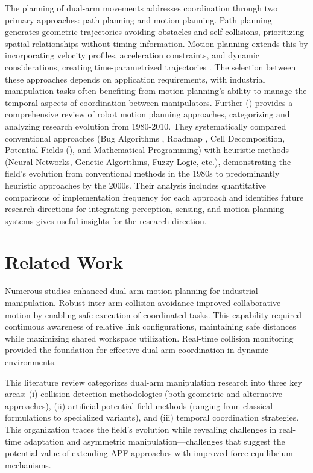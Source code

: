 \documentclass[utf8]{FrontiersinHarvard}
\begin{document}
The planning of dual-arm movements addresses coordination through two primary approaches: path planning and motion planning. Path planning generates geometric trajectories avoiding obstacles and self-collisions, prioritizing spatial relationships without timing information. Motion planning extends this by incorporating velocity profiles, acceleration constraints, and dynamic considerations, creating time-parametrized trajectories \citet{abbas2023systematic}. The selection between these approaches depends on application requirements, with industrial manipulation tasks often benefiting from motion planning's ability to manage the temporal aspects of coordination between manipulators. Further (\citet{tang2012review}) provides a comprehensive review of robot motion planning approaches, categorizing and analyzing research evolution from 1980-2010. They systematically compared conventional approaches (Bug Algorithms \citep{lumelsky1987path}, Roadmap \citep{asano1985visibility, aurenhammer1991voronoi, 99986}, Cell Decomposition, Potential Fields (\citet{khatib}), and Mathematical Programming) with heuristic methods (Neural Networks, Genetic Algorithms, Fuzzy Logic, etc.), demonstrating the field's evolution from conventional methods in the 1980s to predominantly heuristic approaches by the 2000s. Their analysis includes quantitative comparisons of implementation frequency for each approach and identifies future research directions for integrating perception, sensing, and motion planning systems gives useful insights for the research direction.


\section{Related Work}
\label{relatedwork}
Numerous studies enhanced dual-arm motion planning for industrial manipulation. Robust inter-arm collision avoidance improved collaborative motion by enabling safe execution of coordinated tasks. This capability required continuous awareness of relative link configurations, maintaining safe distances while maximizing shared workspace utilization. Real-time collision monitoring provided the foundation for effective dual-arm coordination in dynamic environments.

This literature review categorizes dual-arm manipulation research into three key areas: (i) collision detection methodologies (both geometric and alternative approaches), (ii) artificial potential field methods (ranging from classical formulations to specialized variants), and (iii) temporal coordination strategies. This organization traces the field's evolution while revealing challenges in real-time adaptation and asymmetric manipulation—challenges that suggest the potential value of extending APF approaches with improved force equilibrium mechanisms.
\end{document}
